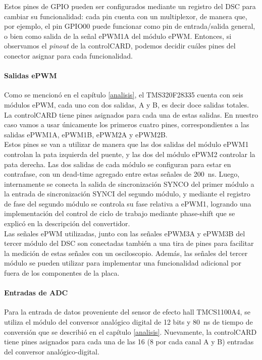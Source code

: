 Estos pines de GPIO pueden ser configurados mediante un registro del DSC para cambiar su funcionalidad: cada pin cuenta con un multiplexor, de manera que, por ejemplo, el pin GPIO00 puede funcionar como pin de entrada/salida general, o bien como salida de la señal ePWM1A del módulo ePWM. Entonces, si observamos el \textit{pinout} de la controlCARD, podemos decidir cuáles pines del conector asignar para cada funcionalidad.\\

\paragraph{Salidas ePWM}

Como se mencionó en el capítulo \ref{analisis}, el TMS320F28335 cuenta con seis módulos ePWM, cada uno con dos salidas, A y B, es decir doce salidas totales. La controlCARD tiene pines asignados para cada una de estas salidas. En nuestro caso vamos a usar únicamente los primeros cuatro pines, correspondientes a las salidas ePWM1A, ePWM1B, ePWM2A y ePWM2B.\\

Estos pines se van a utilizar de manera que las dos salidas del módulo ePWM1 controlan la pata izquierda del puente, y las dos del módulo ePWM2 controlar la pata derecha. Las dos salidas de cada módulo se configuran para estar en contrafase, con un dead-time agregado entre estas señales de \SI[]{200}{\nano\second}. Luego, internamente se conecta la salida de sincronización SYNCO del primer módulo a la entrada de sincronización SYNCI del segundo módulo, y mediante el registro de fase del segundo módulo se controla su fase relativa a ePWM1, logrando una implementación del control de ciclo de trabajo mediante phase-shift que se explicó en la descripción del convertidor.\\

Las señales ePWM utilizadas, junto con las señales ePWM3A y ePWM3B del tercer módulo del DSC son conectadas también a una tira de pines para facilitar la medición de estas señales con un osciloscopio. Además, las señales del tercer módulo se pueden utilizar para implementar una funcionalidad adicional por fuera de los componentes de la placa.\\

\paragraph{Entradas de ADC}

Para la entrada de datos proveniente del sensor de efecto hall TMCS1100A4, se utiliza el módulo del conversor analógico digital de 12 bits y \SI[]{80}{\nano\second} de tiempo de conversión que se describió en el capítulo \ref{analisis}. Nuevamente, la controlCARD tiene pines asignados para cada una de las 16 (8 por cada canal A y B) entradas del conversor analógico-digital.\\

